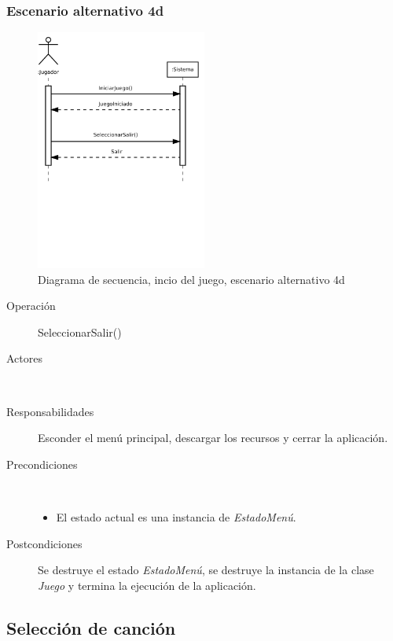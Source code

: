 \subsubsection{Escenario alternativo 4d}
\begin{figure}[h!]
  \centering
  \includegraphics[trim=0cm 12cm 0cm 0cm, clip=true, width=0.5\textwidth]{4_analisis/diagsec_caso1_esc5}
  \caption{Diagrama de secuencia, incio del juego, escenario alternativo 4d}
\end{figure}

\begin{description}
\item[Operación] SeleccionarSalir()
\item[Actores] \jugador\, \sistema\
\item[Responsabilidades] Esconder el menú principal, descargar los recursos y
  cerrar la aplicación.
\item[Precondiciones] $\quad$
  \begin{itemize}
  \item El estado actual es una instancia de \textit{EstadoMenú}.
  \end{itemize}
\item[Postcondiciones] Se destruye el estado \textit{EstadoMenú}, se destruye la
  instancia de la clase \textit{Juego} y termina la ejecución de la aplicación.
\end{description}

\subsection{Selección de canción}

